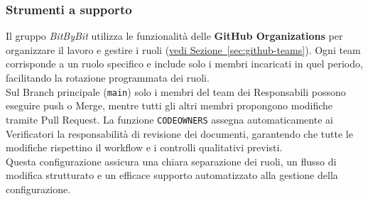 \documentclass[a4paper,12pt]{article}
\begin{document}
\subsubsection{Strumenti a supporto}
Il gruppo \textit{BitByBit} utilizza le funzionalità delle \textbf{GitHub Organizations} per organizzare il lavoro e gestire i ruoli (\hyperref[sec:github-teams]{vedi Sezione~\ref*{sec:github-teams}}). Ogni team corrisponde a un ruolo specifico e include solo i membri incaricati in quel periodo, facilitando la rotazione programmata dei ruoli.\\
Sul Branch principale (\texttt{main}) solo i membri del team dei Responsabili possono eseguire push o Merge, mentre tutti gli altri membri propongono modifiche tramite Pull Request. La funzione \texttt{CODEOWNERS} assegna automaticamente ai Verificatori la responsabilità di revisione dei documenti, garantendo che tutte le modifiche rispettino il workflow e i controlli qualitativi previsti.\\
Questa configurazione assicura una chiara separazione dei ruoli, un flusso di modifica strutturato e un efficace supporto automatizzato alla gestione della configurazione.
\end{document}
